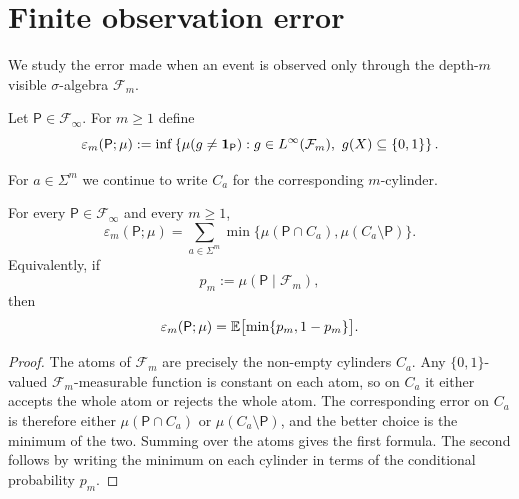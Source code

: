 \section{Finite observation error}\label{sec:clarity}

We study the error made when an event is observed only through the
depth-\(m\) visible \(\sigma\)-algebra \(\mathcal{F}_m\).

\begin{definition}
\label{def:scan-error}\label{def:scan-error-profile}
Let \(\mathsf{P}\in\mathcal{F}_\infty\).  For \(m\geq 1\) define
\[
  \varepsilon_m(\mathsf{P};\mu)
  := \inf\left\{
      \mu(g\neq \mathbf{1}_{\mathsf{P}}):
      g\in L^\infty(\mathcal{F}_m),\ g(X)\subseteq\{0,1\}
     \right\}.
\]
\end{definition}

For \(a\in\Sigma^m\) we continue to write \(C_a\) for the corresponding
\(m\)-cylinder.

\begin{proposition}
\label{prop:scan-error-cylinder}
For every \(\mathsf{P}\in\mathcal{F}_\infty\) and every \(m\geq 1\),
\[
  \varepsilon_m(\mathsf{P};\mu)
  = \sum_{a\in\Sigma^m}
      \min\bigl\{\mu(\mathsf{P}\cap C_a),
                 \mu(C_a\setminus\mathsf{P})\bigr\}.
\]
Equivalently, if
\[
  p_m := \mu(\mathsf{P}\mid \mathcal{F}_m),
\]
then
\[
  \varepsilon_m(\mathsf{P};\mu)
  = \mathbb{E}\bigl[\min\{p_m,1-p_m\}\bigr].
\]
\end{proposition}

\begin{proof}
The atoms of \(\mathcal{F}_m\) are precisely the non-empty cylinders
\(C_a\).  Any \(\{0,1\}\)-valued \(\mathcal{F}_m\)-measurable function is
constant on each atom, so on \(C_a\) it either accepts the whole atom or
rejects the whole atom.  The corresponding error on \(C_a\) is
therefore either \(\mu(\mathsf{P}\cap C_a)\) or
\(\mu(C_a\setminus\mathsf{P})\), and the better choice is the minimum of
the two.  Summing over the atoms gives the first formula.  The second
follows by writing the minimum on each cylinder in terms of the
conditional probability \(p_m\).
\end{proof}

